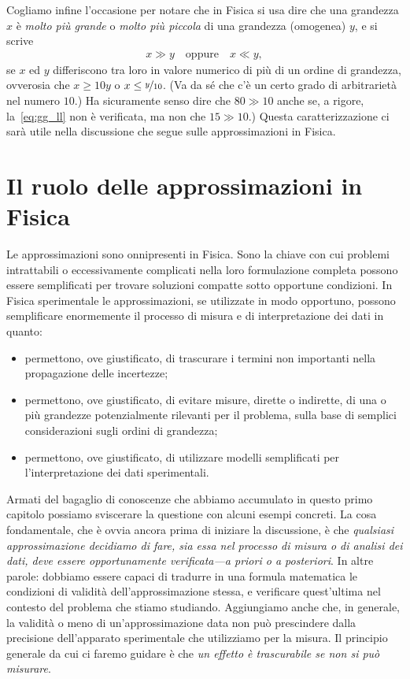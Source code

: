 Cogliamo infine l'occasione per notare che in Fisica si usa dire che una
grandezza $x$ è \emph{molto più grande} o \emph{molto più piccola} di una
grandezza (omogenea) $y$, e si scrive
\begin{align}\label{eq:gg_ll}
  x \gg y \quad \text{oppure} \quad x \ll y,
\end{align}
se $x$ ed $y$ differiscono tra loro in valore numerico di più di un ordine di
grandezza, ovverosia che $x \geq 10y$ o $x \leq \nicefrac{y}{10}$.
(Va da sé che c'è un certo grado di arbitrarietà nel numero $10$.)
Ha sicuramente senso dire che $80 \gg 10$ anche se, a rigore,
la~\eqref{eq:gg_ll} non è verificata, ma non che $15 \gg 10$.) Questa
caratterizzazione ci sarà utile nella discussione che segue sulle
approssimazioni in Fisica.


\section{Il ruolo delle approssimazioni in Fisica}
\label{sec:approssimazioni}

Le approssimazioni sono onnipresenti in Fisica. Sono la chiave con cui problemi
intrattabili o eccessivamente complicati nella loro formulazione completa
possono essere semplificati per trovare soluzioni compatte sotto opportune
condizioni. In Fisica sperimentale le approssimazioni, se utilizzate in
modo opportuno, possono semplificare enormemente il processo di misura e
di interpretazione dei dati in quanto:
\begin{itemize}
\item permettono, ove giustificato, di trascurare i termini non importanti
  nella propagazione delle incertezze;
\item permettono, ove giustificato, di evitare misure, dirette o indirette, di
  una o più grandezze potenzialmente rilevanti per il problema, sulla base di
  semplici considerazioni sugli ordini di grandezza;
\item permettono, ove giustificato, di utilizzare modelli semplificati per
  l'interpretazione dei dati sperimentali.
\end{itemize}

Armati del bagaglio di conoscenze che abbiamo accumulato in questo primo
capitolo possiamo sviscerare la questione con alcuni esempi concreti. La cosa
fondamentale, che è ovvia ancora prima di iniziare la discussione, è che
\emph{qualsiasi approssimazione decidiamo di fare, sia essa nel processo di
  misura o di analisi dei dati, deve essere opportunamente verificata---a
  priori o a posteriori}.
In altre parole: dobbiamo essere capaci di tradurre in una formula matematica
le condizioni di validità dell'approssimazione stessa, e verificare
quest'ultima nel contesto del problema che stiamo studiando.
Aggiungiamo anche che, in generale, la validità o meno di un'approssimazione
data non può prescindere dalla precisione dell'apparato sperimentale che
utilizziamo per la misura. Il principio generale da cui ci faremo guidare
è che \emph{un effetto è trascurabile se non si può misurare}.


